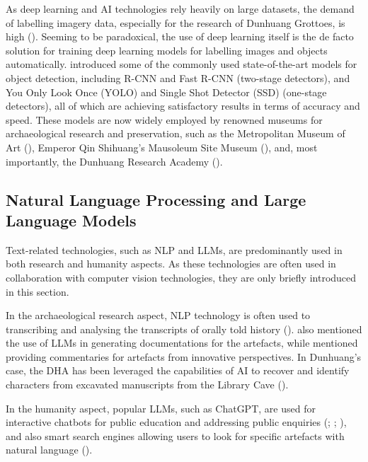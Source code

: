 As deep learning and AI technologies rely heavily on large datasets, the demand of labelling imagery data,
especially for the research of Dunhuang Grottoes, is high ().
Seeming to be paradoxical, the use of deep learning itself is the de facto solution for training deep learning
models for labelling images and objects automatically. 
introduced some of the commonly used state-of-the-art models for object detection, including R-CNN and Fast R-CNN
(two-stage detectors), and You Only Look Once (YOLO) and Single Shot Detector (SSD) (one-stage detectors),
all of which are achieving satisfactory results in terms of accuracy and speed.
These models are now widely employed by renowned museums for archaeological research and preservation, such
as the Metropolitan Museum of Art (),
Emperor Qin Shihuang's Mausoleum Site Museum (),
and, most importantly, the Dunhuang Research Academy ().

\subsection{Natural Language Processing and Large Language Models}

Text-related technologies, such as NLP and LLMs, are predominantly used in both research and humanity aspects.
As these technologies are often used in collaboration with computer vision technologies, they are only briefly
introduced in this section.

In the archaeological research aspect, NLP technology is often used to transcribing and analysing the transcripts
of orally told history ().
 also mentioned the use of LLMs in generating documentations
for the artefacts, while  mentioned
providing commentaries for artefacts from innovative perspectives. In Dunhuang's case, the DHA has been leveraged
the capabilities of AI to recover and identify characters from excavated manuscripts from the Library Cave
().

In the humanity aspect, popular LLMs, such as ChatGPT, are used for interactive chatbots for public education
and addressing public enquiries (; ;
), and also smart search engines allowing users to look for specific
artefacts with natural language ().

